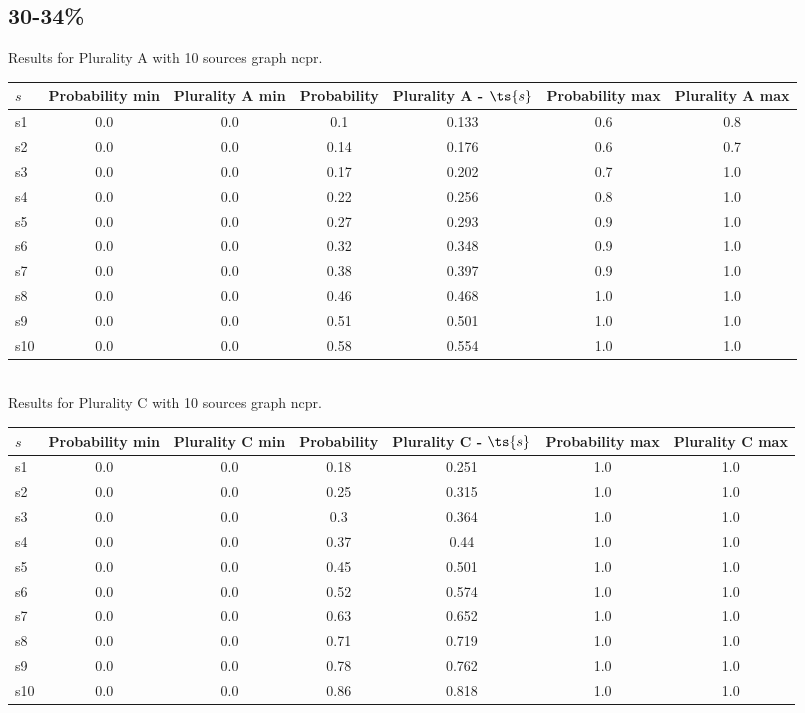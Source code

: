 \documentclass{article}
\begin{document}
\newpage

\subsection{30-34\%}

\noindent Results for Plurality A with 10 sources graph ncpr.

\noindent\begin{tabular}{|l|c|c|c|c|c|c|}
\hline
$s$& Probability min & Plurality A min & Probability & Plurality A - $\ts{s}$ & Probability max & Plurality A max\\
\hline
s1 &0.0 & 0.0 & 0.1 & 0.133 & 0.6 & 0.8\\
\hline
s2 &0.0 & 0.0 & 0.14 & 0.176 & 0.6 & 0.7\\
\hline
s3 &0.0 & 0.0 & 0.17 & 0.202 & 0.7 & 1.0\\
\hline
s4 &0.0 & 0.0 & 0.22 & 0.256 & 0.8 & 1.0\\
\hline
s5 &0.0 & 0.0 & 0.27 & 0.293 & 0.9 & 1.0\\
\hline
s6 &0.0 & 0.0 & 0.32 & 0.348 & 0.9 & 1.0\\
\hline
s7 &0.0 & 0.0 & 0.38 & 0.397 & 0.9 & 1.0\\
\hline
s8 &0.0 & 0.0 & 0.46 & 0.468 & 1.0 & 1.0\\
\hline
s9 &0.0 & 0.0 & 0.51 & 0.501 & 1.0 & 1.0\\
\hline
s10 &0.0 & 0.0 & 0.58 & 0.554 & 1.0 & 1.0\\
\hline
\end{tabular}\\

\noindent Results for Plurality C with 10 sources graph ncpr.

\noindent\begin{tabular}{|l|c|c|c|c|c|c|}
\hline
$s$& Probability min & Plurality C min & Probability & Plurality C - $\ts{s}$ & Probability max & Plurality C max\\
\hline
s1 &0.0 & 0.0 & 0.18 & 0.251 & 1.0 & 1.0\\
\hline
s2 &0.0 & 0.0 & 0.25 & 0.315 & 1.0 & 1.0\\
\hline
s3 &0.0 & 0.0 & 0.3 & 0.364 & 1.0 & 1.0\\
\hline
s4 &0.0 & 0.0 & 0.37 & 0.44 & 1.0 & 1.0\\
\hline
s5 &0.0 & 0.0 & 0.45 & 0.501 & 1.0 & 1.0\\
\hline
s6 &0.0 & 0.0 & 0.52 & 0.574 & 1.0 & 1.0\\
\hline
s7 &0.0 & 0.0 & 0.63 & 0.652 & 1.0 & 1.0\\
\hline
s8 &0.0 & 0.0 & 0.71 & 0.719 & 1.0 & 1.0\\
\hline
s9 &0.0 & 0.0 & 0.78 & 0.762 & 1.0 & 1.0\\
\hline
s10 &0.0 & 0.0 & 0.86 & 0.818 & 1.0 & 1.0\\
\hline
\end{tabular}\\
\end{document}
